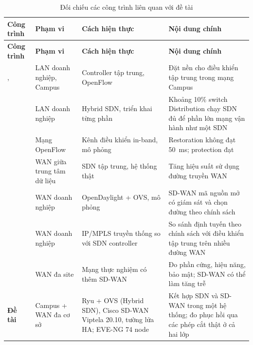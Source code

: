 \begingroup
\small
\setlength{\tabcolsep}{4pt}
\begin{longtable}{|L{3.0cm}|L{2.2cm}|L{\dimexpr\textwidth-3.0cm-2.2cm-4.2cm-8\arrayrulewidth\relax}|L{4.2cm}|}
    \caption{Đối chiếu các công trình liên quan với đề tài}\label{tab:nghien_cuu_lien_quan} \\
    \hline
    \textbf{Công trình} & \textbf{Phạm vi} & \textbf{Cách hiện thực} & \textbf{Nội dung chính} \\
    \hline
    \endfirsthead
    \hline
    \textbf{Công trình} & \textbf{Phạm vi} & \textbf{Cách hiện thực} & \textbf{Nội dung chính} \\
    \hline
    \endhead
    \hline
    \endfoot
    \citet{casado2007ethane}, \citet{mckeown2008openflow} & LAN doanh nghiệp, Campus & Controller tập trung, OpenFlow & Đặt nền cho điều khiển tập trung trong mạng Campus \\
    \hline
    \citet{levin2014panopticon} & LAN doanh nghiệp & Hybrid SDN, triển khai từng phần & Khoảng 10\% switch Distribution chạy SDN đủ để phần lớn mạng vận hành như một SDN \\
    \hline
    \citet{sharma2013inband} & Mạng OpenFlow & Kênh điều khiển in-band, mô phỏng & Restoration không đạt 50~ms; protection đạt \\
    \hline
    \citet{jain2013b4} & WAN giữa trung tâm dữ liệu & SDN tập trung, hệ thống thật & Tăng hiệu suất sử dụng đường truyền WAN \\
    \hline
    \citet{troia2020sdwan} & WAN doanh nghiệp & OpenDaylight + OVS, mô phỏng & SD-WAN mã nguồn mở có giám sát và chọn đường theo chính sách \\
    \hline
    \citet{seremet2019mpls} & WAN doanh nghiệp & IP/MPLS truyền thống so với SDN controller & So sánh định tuyến theo chính sách với điều khiển tập trung trên nhiều đường WAN \\
    \hline
    \citet{sun2024sdwan} & WAN đa site & Mạng thực nghiệm có thêm SD-WAN & Đo phần cứng, hiệu năng, bảo mật; SD-WAN có thể làm tăng trễ \\
    \hline
    \textbf{Đề tài} & Campus + WAN đa cơ sở & Ryu + OVS (Hybrid SDN), Cisco SD-WAN Viptela 20.10, tường lửa HA; EVE-NG 74 node & Kết hợp SDN và SD-WAN trong một hệ thống; đo phục hồi qua các phép cắt thật ở cả hai lớp \\
\end{longtable}
\endgroup
